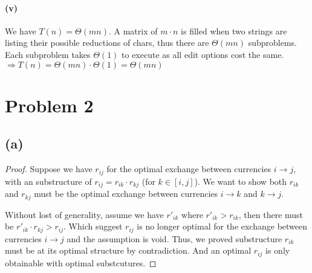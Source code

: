 \documentclass[11pt]{article}
\begin{document}
\paragraph{(v)}
We have $T(n) = \Theta(mn)$. A matrix of $m \cdot n$ is filled when two strings are listing their possible reductions of chars, thus there are $\Theta(mn)$ subproblems. Each subproblem takes $\Theta(1)$ to execute as all edit options cost the same.\\
$\Longrightarrow T(n) =  \Theta(mn) \cdot \Theta(1) =  \Theta(mn)$

\section{Problem 2}

\subsection{(a)}
\begin{proof}
Suppose we have $r_{ij}$ for the optimal exchange between currencies $i \to j$, with an substructure of $r_{ij} = r_{ik} \cdot r_{kj}$ (for $k \in [i,j]$). We want to show both $r_{ik}$ and $r_{kj}$ must be the optimal exchange between currencies $i \to k$ and $k \to j$.

Without lost of generality, assume we have $r'_{ik}$ where $r'_{ik} > r_{ik}$, then there must be $r'_{ik} \cdot r_{kj} > r_{ij}$. Which suggest $r_{ij}$ is no longer optimal for the exchange between currencies $i \to j$ and the assumption is void. Thus, we proved substructure $r_{ik}$ must be at its optimal structure by contradiction. And an optimal $r_{ij}$ is only obtainable with optimal substcutures.
\end{proof}

%
% 
% 
\end{document}
